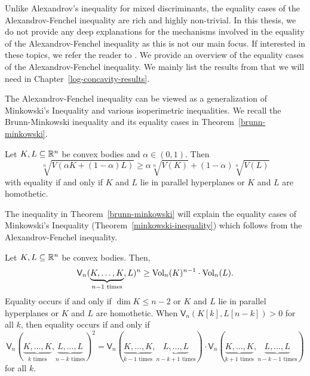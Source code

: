 \documentclass{puthesis-UG}
\begin{document}
Unlike Alexandrov's inequality for mixed discriminants, the equality cases of the Alexandrov-Fenchel inequality are rich and highly non-trivial. In this thesis, we do not provide any deep explanations for the mechanisms involved in the equality of the Alexandrov-Fenchel inequality as this is not our main focus. If interested in these topics, we refer the reader to \cite{minkowski-quadratic-inequality,shenfeld2022extremals}. We provide an overview of the equality cases of the Alexandrov-Fenchel inequality. We mainly list the results from \cite{shenfeld2022extremals} that we will need in Chapter~\ref{log-concavity-results}.

The Alexandrov-Fenchel inequality can be viewed as a generalization of Minkowski's Inequality and various isoperimetric inequalities. We recall the Brunn-Minkowski inequality and its equality cases in Theorem~\ref{brunn-minkowski}.
\begin{thm} \label{brunn-minkowski}
	Let $K, L \subseteq \mathbb{R}^n$ be convex bodies and $\alpha \in (0, 1)$. Then
	\[
		\sqrt[n]{V(\alpha K + (1-\alpha) L)} \geq \alpha \sqrt[n]{V(K)} + (1-\alpha) \sqrt[n]{V(L)}
	\]
	with equality if and only if $K$ and $L$ lie in parallel hyperplanes or $K$ and $L$ are homothetic. 
\end{thm}

The inequality in Theorem~\ref{brunn-minkowski} will explain the equality cases of Minkowski's Inequality (Theorem~\ref{minkowski-inequality}) which follows from the Alexandrov-Fenchel inequality.

\begin{thm} \label{minkowski-inequality}
	Let $K, L \subseteq \mathbb{R}^n$ be convex bodies. Then, 
	\[
		\mathsf{V}_n(\underbrace{K, \ldots, K}_{n-1 \text{ times}}, L)^n \geq \operatorname{Vol}_n(K)^{n-1} \cdot \operatorname{Vol}_n(L).
	\]
	Equality occurs if and only if $\dim K \leq n-2$ or $K$ and $L$ lie in parallel hyperplanes or $K$ and $L$ are homothetic. When $\mathsf{V}_n(K[k], L[n-k]) > 0$ for all $k$, then equality occurs if and only if 
	\[
		\mathsf{V}_n(\underbrace{K, \ldots, K}_{k \text{ times}}, \underbrace{L, \ldots, L}_{n-k \text{ times}})^2 = \mathsf{V}_n(\underbrace{K, \ldots, K}_{k-1 \text{ times}}, \underbrace{L, \ldots, L}_{n-k+1 \text{ times}}) \cdot \mathsf{V}_n(\underbrace{K, \ldots, K}_{k+1 \text{ times}}, \underbrace{L, \ldots, L}_{n-k-1 \text{ times}})
	\]
	for all $k$. 
\end{thm}
\end{document}

